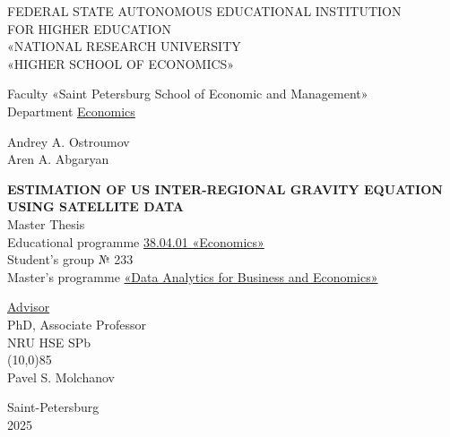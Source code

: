 \thispagestyle{empty}
\begin{center}
\uppercase{Federal state autonomous educational institution \\ for higher education} \\
«NATIONAL RESEARCH UNIVERSITY \\
«HIGHER SCHOOL OF ECONOMICS»
\vspace{5ex}

Faculty «Saint Petersburg School of Economic and Management» \\
\vspace{0.5ex}
Department \underline{Economics}
\end{center}
\vspace{10ex}
\begin{center}
\noindent
Andrey A. Ostroumov \\
Aren A. Abgaryan \\
\end{center}
\vspace{5ex}
\begin{center}
\textbf{\uppercase{Estimation of US Inter-Regional Gravity Equation Using Satellite Data}}\\
\vspace{5ex}
Master Thesis \\
Educational programme \underline{38.04.01 «Economics»} \\
Student’s group № 233\\
Master’s programme \underline{«Data Analytics for Business and Economics»} \\
\vspace{15ex}
\end{center}

\begin{flushleft}
    \hspace{60ex} \underline{Advisor} \\
    \hspace{60ex} PhD, Associate Professor \\
    \hspace{60ex} NRU HSE SPb \\
    \hspace{60ex} \line(10,0){85} \\
    \hspace{60ex} Pavel S. Molchanov 
\end{flushleft}

\vfill
\begin{center}
Saint-Petersburg \\
2025
\end{center}

\newpage